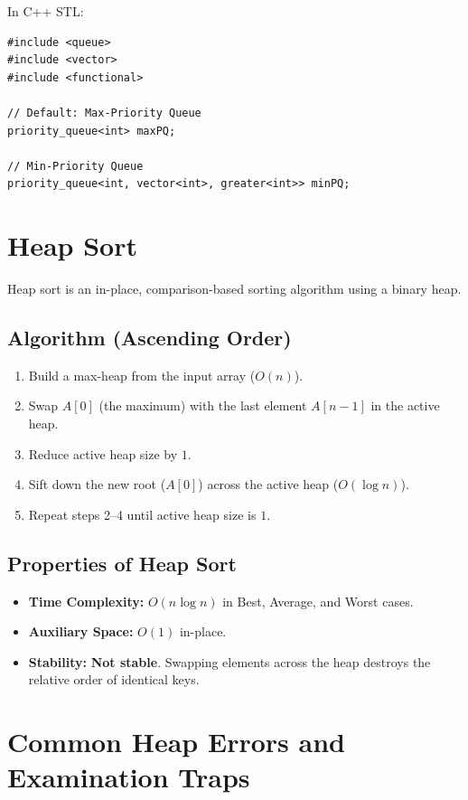 In C++ STL:
\begin{lstlisting}[style=cppstyle]
#include <queue>
#include <vector>
#include <functional>

// Default: Max-Priority Queue
priority_queue<int> maxPQ;

// Min-Priority Queue
priority_queue<int, vector<int>, greater<int>> minPQ;
\end{lstlisting}

\section{Heap Sort}

Heap sort is an in-place, comparison-based sorting algorithm using a binary heap.

\subsection{Algorithm (Ascending Order)}
\begin{enumerate}
    \item Build a max-heap from the input array ($O(n)$).
    \item Swap $A[0]$ (the maximum) with the last element $A[n-1]$ in the active heap.
    \item Reduce active heap size by $1$.
    \item Sift down the new root ($A[0]$) across the active heap ($O(\log n)$).
    \item Repeat steps 2--4 until active heap size is $1$.
\end{enumerate}

\subsection{Properties of Heap Sort}
\begin{itemize}
    \item \textbf{Time Complexity:} $O(n \log n)$ in Best, Average, and Worst cases.
    \item \textbf{Auxiliary Space:} $O(1)$ in-place.
    \item \textbf{Stability:} \textbf{Not stable}. Swapping elements across the heap destroys the relative order of identical keys.
\end{itemize}

\section{Common Heap Errors and Examination Traps}

